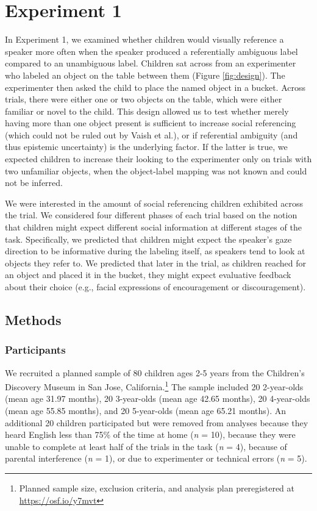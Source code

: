 \documentclass[10pt, letterpaper]{article}
\begin{document}
\section{Experiment 1}\label{experiment-1}

In Experiment 1, we examined whether children would visually reference a
speaker more often when the speaker produced a referentially ambiguous
label compared to an unambiguous label. Children sat across from an
experimenter who labeled an object on the table between them (Figure
\ref{fig:design}). The experimenter then asked the child to place the
named object in a bucket. Across trials, there were either one or two
objects on the table, which were either familiar or novel to the child.
This design allowed us to test whether merely having more than one
object present is sufficient to increase social referencing (which could
not be ruled out by Vaish et al.), or if referential ambiguity (and thus
epistemic uncertainty) is the underlying factor. If the latter is true,
we expected children to increase their looking to the experimenter only
on trials with two unfamiliar objects, when the object-label mapping was
not known and could not be inferred.

We were interested in the amount of social referencing children
exhibited across the trial. We considered four different phases of each
trial based on the notion that children might expect different social
information at different stages of the task. Specifically, we predicted
that children might expect the speaker's gaze direction to be
informative during the labeling itself, as speakers tend to look at
objects they refer to. We predicted that later in the trial, as children
reached for an object and placed it in the bucket, they might expect
evaluative feedback about their choice (e.g., facial expressions of
encouragement or discouragement).

\subsection{Methods}\label{methods}

\subsubsection{Participants}\label{participants}

We recruited a planned sample of 80 children ages 2-5 years from the
Children's Discovery Museum in San Jose, California.\footnote{Planned
  sample size, exclusion criteria, and analysis plan preregistered at
  \url{https://osf.io/y7mvt}} The sample included 20 2-year-olds (mean
age 31.97 months), 20 3-year-olds (mean age 42.65 months), 20
4-year-olds (mean age 55.85 months), and 20 5-year-olds (mean age 65.21
months). An additional 20 children participated but were removed from
analyses because they heard English less than 75\% of the time at home
(\emph{n} = 10), because they were unable to complete at least half of
the trials in the task (\emph{n} = 4), because of parental interference
(\emph{n} = 1), or due to experimenter or technical errors (\emph{n} =
5).
\end{document}

